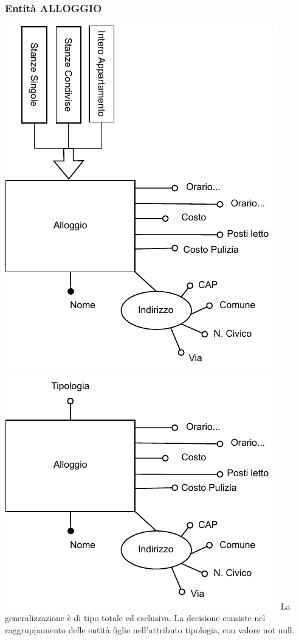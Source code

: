 \subsubsection{Entità ALLOGGIO}
\includegraphics[width=\textwidth]{resources/page9}
\clearpage
\includegraphics[width=\textwidth]{resources/page10}
La generalizzazione è di tipo totale ed esclusiva. La decisione consiste nel raggruppamento delle entità	figlie nell'attributo tipologia, con valore not null.


